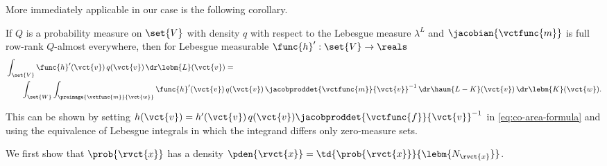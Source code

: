 More immediately applicable in our case is the following corollary.
\begin{corollary}\label{col:co-area-formula}
If $Q$ is a probability measure on $\set{V}$ with density $q$ with respect to the Lebesgue measure $\lambda^L$ and $\jacobian{\vctfunc{m}}$ is full row-rank $Q$-almost everywhere, then for Lebesgue measurable $\func{h}' : \set{V} \to \reals$
\begin{equation}\label{eq:co-area-formula-corollary}
\begin{split}
    &\int_{\set{V}} 
      \func{h}'(\vct{v})\,q(\vct{v})
    \,\dr\lebm{L}(\vct{v})
    =\,\\
    &\qquad
    \int_{\set{W}}
      \int_{\preimage{\vctfunc{m}}{\vct{w}}}
        \func{h}'(\vct{v}) \,
        q(\vct{v})\,
        \jacobproddet{\vctfunc{m}}{\vct{v}}^{-1}
      \,\dr\haum{L-K}(\vct{v})
    \,\dr\lebm{K}(\vct{w}).
\end{split}
\end{equation}
\end{corollary}
This can be shown by setting $h(\vct{v}) = h'(\vct{v})\,q(\vct{v})\jacobproddet{\vctfunc{f}}{\vct{v}}^{-1}$ in \eqref{eq:co-area-formula} and using the equivalence of Lebesgue integrals in which the integrand differs only zero-measure sets. 

We first show that $\prob{\rvct{x}}$ has a density $\pden{\rvct{x}} = \td{\prob{\rvct{x}}}{\lebm{N_{\rvct{x}}}}$.

